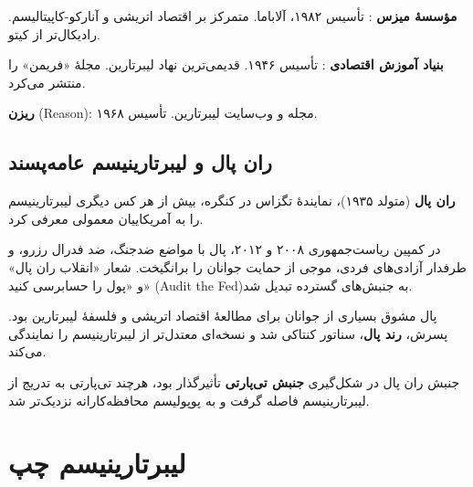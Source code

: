 \textbf{مؤسسهٔ میزس} : تأسیس ۱۹۸۲، آلاباما. متمرکز بر اقتصاد اتریشی و آنارکو-کاپیتالیسم. رادیکال‌تر از کیتو.

\textbf{بنیاد آموزش اقتصادی} : تأسیس ۱۹۴۶. قدیمی‌ترین نهاد لیبرتارین. مجلهٔ «فریمن» را منتشر می‌کرد.

\textbf{ریزن} (Reason): مجله و وب‌سایت لیبرتارین. تأسیس ۱۹۶۸.

\subsection{ران پال و لیبرتارینیسم عامه‌پسند}


\textbf{ران پال} (متولد ۱۹۳۵)، نمایندهٔ تگزاس در کنگره، بیش از هر کس دیگری لیبرتارینیسم را به آمریکاییان معمولی معرفی کرد.

در کمپین ریاست‌جمهوری ۲۰۰۸ و ۲۰۱۲، پال با مواضع ضدجنگ، ضد فدرال رزرو، و طرفدار آزادی‌های فردی، موجی از حمایت جوانان را برانگیخت. شعار «انقلاب ران پال» و «پول را حسابرسی کنید» {(Audit the Fed)}\lr به جنبش‌های گسترده تبدیل شد.

پال مشوق بسیاری از جوانان برای مطالعهٔ اقتصاد اتریشی و فلسفهٔ لیبرتارین بود. پسرش، \textbf{رند پال}، سناتور کنتاکی شد و نسخه‌ای معتدل‌تر از لیبرتارینیسم را نمایندگی می‌کند.

جنبش ران پال در شکل‌گیری \textbf{جنبش تی‌پارتی} تأثیرگذار بود، هرچند تی‌پارتی به تدریج از لیبرتارینیسم فاصله گرفت و به پوپولیسم محافظه‌کارانه نزدیک‌تر شد.

\section{لیبرتارینیسم چپ}

